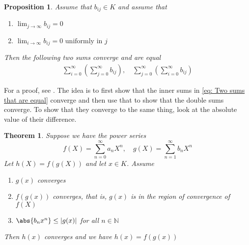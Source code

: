 \documentclass{article}
\newtheorem{theorem}{Theorem}[section]
\newtheorem{proposition}{Proposition}[section]
\newcommand{\mbb}[1]{\mathbb{#1}}
\numberwithin{equation}{section}
\begin{document}
\begin{proposition}\label{prop: Swap of summation}
	Assume that $b_{ij} \in K$ and assume that
	\begin{enumerate}
    	\item $\lim_{j \to \infty}b_{ij} = 0$
    	\item $\lim_{i \to \infty} b_{ij} = 0 \text{ uniformly in } j$
	\end{enumerate}
	Then the following two sums converge and are equal
	\begin{equation}\label{eq: Two sums that are equal}
    	\begin{aligned}
        	\sum_{i = 0}^\infty (\sum_{j = 0}^\infty b_{ij}), \quad \sum_{j = 0}^\infty (\sum_{i = 0}^\infty b_{ij})
    	\end{aligned}
	\end{equation}
\end{proposition}
For a proof, see \citep[Proposition 5.1.4]{gouvea}. The idea is to first show that the inner sums in \cref{eq: Two sums that are equal} converge and then use that to show that the double sums converge. To show that they converge to the same thing, look at the absolute value of their difference.
\begin{theorem}\label{prop: The composite of formal power series converges}
	Suppose we have the power series
	$$f(X) = \sum_{n=0}^\infty a_n X^n, \quad g(X) = \sum_{n=1}^\infty b_n X^n$$
	Let $h(X) = f(g(X))$ and let $x \in K$. Assume
	\begin{enumerate}
    	\item $g(x)$ converges
    	\item $f(g(x))$ converges, that is, $g(x)$ is in the region of convergence of $f(X)$
    	\item $\abs{b_n x^n} \leq |g(x)|$ for all $n \in \mbb N$
	\end{enumerate}
	Then $h(x)$ converges and we have $h(x) = f(g(x))$
\end{theorem}
\end{document}
